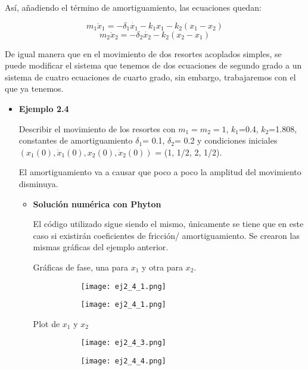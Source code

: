 \documentclass[12pt]{article}
\begin{document}
Así, añadiendo el término de amortiguamiento, las ecuaciones quedan:

\begin{equation}
m_1 \ddot x_1 = -\delta _1 \dot{x_1} -k_1x_1 - k_2(x_1-x_2)
\end{equation}
\begin{equation}
m_2 \ddot x_2 = -\delta _2 \dot{x_2} -k_2(x_2-x_1)
\end{equation}

De igual manera que en el movimiento de dos resortes acoplados simples, se puede modificar el sistema que tenemos de dos ecuaciones de segundo grado a un sistema de cuatro ecuaciones de cuarto grado, sin embargo, trabajaremos con el que ya tenemos. 

\begin{itemize}
\item \textbf{Ejemplo 2.4}

Describir el movimiento de los resortes con $m_1 = m_2 = 1$, $k_1$=0.4, $k_2$=1.808, constantes de amortiguamiento $\delta _1$= 0.1, $\delta _2$= 0.2 y condiciones iniciales $(x_1(0), \dot x_1(0), x_2(0), \dot x_2(0))$ = (1, 1/2, 2, 1/2).

El amortiguamiento va a causar que poco a poco la amplitud del movimiento disminuya. 

\begin{itemize}
\item \textbf{Solución numérica con Phyton}

El código utilizado sigue siendo el mismo, únicamente se tiene que en este caso si existirán coeficientes de fricción/ amortiguamiento.
Se crearon las mismas gráficas del ejemplo anterior.

Gráficas de fase, una para $x_1$ y otra para $x_2$.

\begin{figure}[h!]
\begin{subfigure}{.45\textwidth}
\centering
\texttt{[image: ej2\_4\_1.png]}
\end{subfigure}
\begin{subfigure}{.45\textwidth}
\centering
\texttt{[image: ej2\_4\_1.png]}
\end{subfigure}
\end{figure}

Plot de $x_1$ y $x_2$
\begin{figure}[h!]
\begin{subfigure}{.55\textwidth}
\centering
\texttt{[image: ej2\_4\_3.png]}
\end{subfigure}
\begin{subfigure}{.55\textwidth}
\centering
\texttt{[image: ej2\_4\_4.png]}
\end{subfigure}
\end{figure}


\end{itemize}
\end{itemize}
\end{document}
